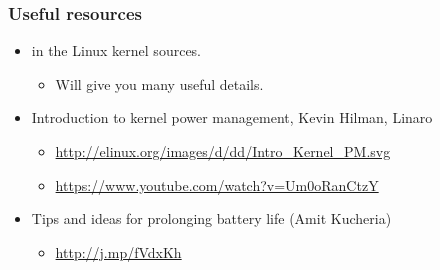 \begin{frame}
  \frametitle{Useful resources}
  \begin{itemize}
  \item {} in the Linux kernel sources.
    \begin{itemize}
    \item Will give you many useful details.
    \end{itemize}
  \item Introduction to kernel power management, Kevin Hilman, Linaro
    \begin{itemize}
      \item \url{http://elinux.org/images/d/dd/Intro_Kernel_PM.svg}
      \item \url{https://www.youtube.com/watch?v=Um0oRanCtzY}
    \end{itemize}
  \item Tips and ideas for prolonging battery life (Amit Kucheria)
    \begin{itemize}
    \item \url{http://j.mp/fVdxKh}
    \end{itemize}
  \end{itemize}
\end{frame}
